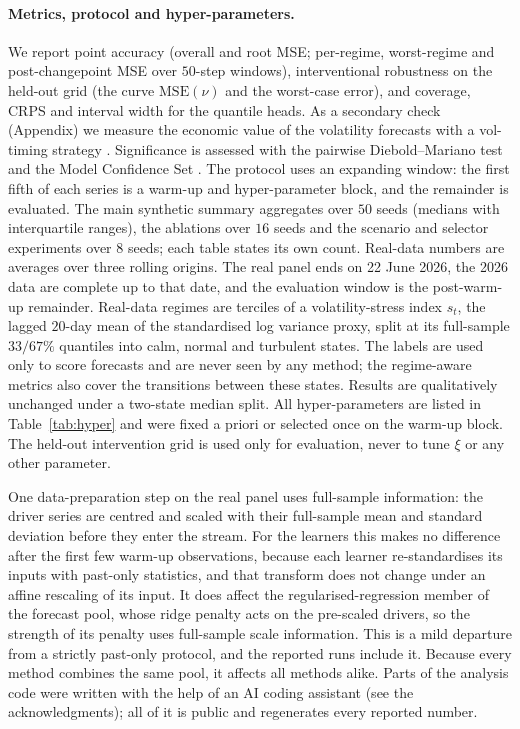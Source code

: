 \documentclass[11pt]{article}
\theoremstyle{plain}
\theoremstyle{remark}
\begin{document}
\paragraph{Metrics, protocol and hyper-parameters.}
We report point accuracy (overall and root MSE; per-regime, worst-regime and
post-changepoint MSE over $50$-step windows), interventional robustness on the
held-out grid (the curve $\mathrm{MSE}(\nu)$ and the worst-case error), and coverage,
CRPS and interval width for the quantile heads. As a secondary check (Appendix) we
measure the economic value of the volatility forecasts with a vol-timing strategy
\citep{fleming2001voltiming}. Significance is assessed with the pairwise
Diebold--Mariano test \citep{diebold1995dm} and the Model Confidence Set
\citep{hansen2011mcs}. The protocol uses an expanding window: the first fifth of each
series is a warm-up and hyper-parameter block, and the remainder is evaluated. The
main synthetic summary aggregates over $50$ seeds (medians with interquartile ranges),
the ablations over $16$ seeds and the scenario and selector experiments over $8$
seeds; each table states its own count. Real-data numbers are averages over three
rolling origins. The real panel ends on 22 June 2026, the 2026 data are complete up to
that date, and the evaluation window is the post-warm-up remainder. Real-data regimes
are terciles of a volatility-stress index $s_t$, the lagged $20$-day mean of the standardised log variance proxy, split at its full-sample $33/67\%$ quantiles into calm, normal and turbulent states. The labels are used only to score forecasts and are never seen by any method; the
regime-aware metrics also cover the transitions between these states. Results are
qualitatively unchanged under a two-state median split. All hyper-parameters are
listed in Table~\ref{tab:hyper} and were fixed a priori or selected once on the
warm-up block. The held-out intervention grid is used only for evaluation, never to tune $\xi$ or any other parameter.

One data-preparation step on the real panel uses full-sample information: the driver series are centred and scaled with their full-sample mean and standard deviation before they enter the stream. For the learners this makes no difference after the first few warm-up observations, because each learner re-standardises its inputs with past-only statistics, and that transform does not change under an affine rescaling of its input. It does affect the regularised-regression member of the forecast pool, whose ridge penalty acts on the pre-scaled drivers, so the strength of its penalty uses full-sample scale information. This is a mild departure from a strictly past-only protocol, and the reported runs include it. Because every method combines the same pool, it affects all methods alike. Parts of the analysis code were written with the help of an AI
coding assistant (see the acknowledgments); all of it is public and regenerates
every reported number.
\end{document}
